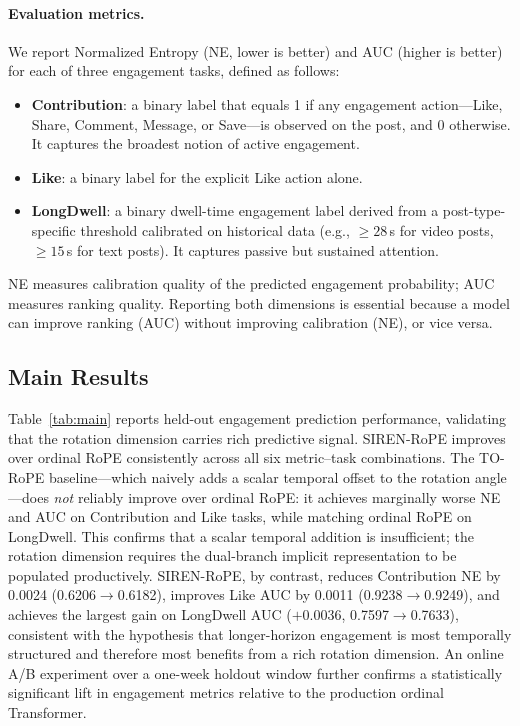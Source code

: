 \documentclass{article}
\begin{document}
\paragraph{Evaluation metrics.}
We report Normalized Entropy (NE, lower is better) and AUC (higher is
better) for each of three engagement tasks, defined as follows:
\begin{itemize}
  \item \textbf{Contribution}: a binary label that equals 1 if any engagement
    action---Like, Share, Comment, Message, or Save---is observed on the post,
    and 0 otherwise. It captures the broadest notion of active engagement.
  \item \textbf{Like}: a binary label for the explicit Like action alone.
  \item \textbf{LongDwell}: a binary dwell-time engagement label derived from a
    post-type-specific threshold calibrated on historical data (e.g.,
    $\geq\!28$\,s for video posts, $\geq\!15$\,s for text posts). It captures
    passive but sustained attention.
\end{itemize}
NE measures calibration quality of the predicted engagement probability;
AUC measures ranking quality. Reporting both dimensions is essential because
a model can improve ranking (AUC) without improving calibration (NE), or
vice versa.

\subsection{Main Results}

Table~\ref{tab:main} reports held-out engagement prediction performance,
validating that the rotation dimension carries rich predictive signal.
SIREN-RoPE improves over ordinal RoPE consistently across all six
metric--task combinations. The TO-RoPE baseline---which naively adds a
scalar temporal offset to the rotation angle---does \emph{not} reliably
improve over ordinal RoPE: it achieves marginally worse NE and AUC on
Contribution and Like tasks, while matching ordinal RoPE on LongDwell.
This confirms that a scalar temporal addition is insufficient; the rotation
dimension requires the dual-branch implicit representation to be populated
productively. SIREN-RoPE, by contrast, reduces Contribution NE by 0.0024
(0.6206$\to$0.6182), improves Like AUC by 0.0011 (0.9238$\to$0.9249), and
achieves the largest gain on LongDwell AUC ($+$0.0036, 0.7597$\to$0.7633),
consistent with the hypothesis that longer-horizon engagement is most
temporally structured and therefore most benefits from a rich rotation
dimension. An online A/B experiment over a one-week holdout window further
confirms a statistically significant lift in engagement metrics relative to
the production ordinal Transformer.
\end{document}
